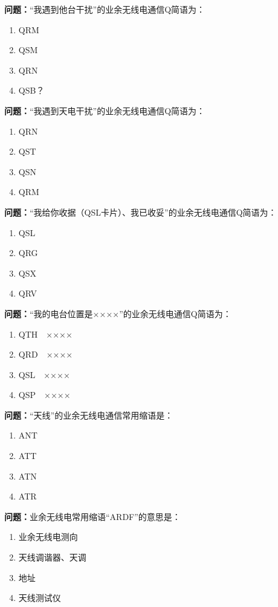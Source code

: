 \documentclass{ctexbook}
\begin{document}
\textbf{问题：}“我遇到他台干扰”的业余无线电通信Q简语为：
\begin{enumerate}[label=\Alph*), leftmargin=3em]
\item QRM
\item QSM
\item QRN
\item QSB？
\end{enumerate}

\textbf{问题：}“我遇到天电干扰”的业余无线电通信Q简语为：
\begin{enumerate}[label=\Alph*), leftmargin=3em]
\item QRN
\item QST
\item QSN
\item QRM
\end{enumerate}

\textbf{问题：}“我给你收据（QSL卡片）、我已收妥”的业余无线电通信Q简语为：
\begin{enumerate}[label=\Alph*), leftmargin=3em]
\item QSL
\item QRG
\item QSX
\item QRV
\end{enumerate}

\textbf{问题：}“我的电台位置是××××”的业余无线电通信Q简语为：
\begin{enumerate}[label=\Alph*), leftmargin=3em]
\item QTH　××××
\item QRD　××××
\item QSL　××××
\item QSP　××××
\end{enumerate}

\textbf{问题：}“天线”的业余无线电通信常用缩语是：
\begin{enumerate}[label=\Alph*), leftmargin=3em]
\item ANT
\item ATT
\item ATN
\item ATR
\end{enumerate}

\textbf{问题：}业余无线电常用缩语“ARDF”的意思是：
\begin{enumerate}[label=\Alph*), leftmargin=3em]
\item 业余无线电测向
\item 天线调谐器、天调
\item 地址
\item 天线测试仪
\end{enumerate}
\end{document}
